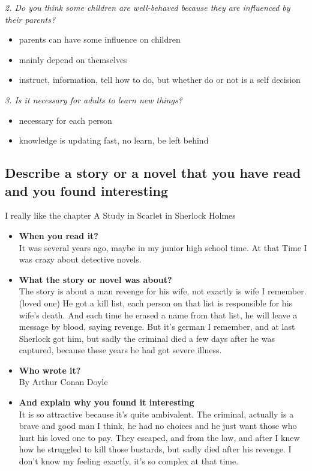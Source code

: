 \documentclass[conference]{IEEEtran}
\begin{document}
\textit{2. Do you think some children are well-behaved because they are influenced by their parents?}
\begin{itemize}
    \item parents can have some influence on children 
    \item mainly depend on themselves
    \item instruct, information, tell how to do, but whether do or not is a self decision
\end{itemize}

\textit{3. Is it necessary for adults to learn new things?}
\begin{itemize}
    \item necessary for each person
    \item knowledge is updating fast, no learn, be left behind
\end{itemize}

\subsection{Describe a story or a novel that you have read and you found interesting}
I really like the chapter A Study in Scarlet in Sherlock Holmes
\begin{itemize}
    \item \textbf{When you read it?}\\
    It was several years ago, maybe in my junior high school time.
    At that Time I was crazy about detective novels.
    \item \textbf{What the story or novel was about?}\\
    The story is about a man revenge for his wife, not exactly is wife I remember.(loved one)
    He got a kill list, each person on that list is responsible for his wife's death.
    And each time he erased a name from that list, he will leave a message by blood, saying revenge.
    But it's german I remember, and at last Sherlock got him, but sadly the criminal died a few days
    after he was captured, because these years he had got severe illness.
    \item \textbf{Who wrote it?}\\
    By Arthur Conan Doyle
    \item \textbf{And explain why you found it interesting}\\
    It is so attractive because it's quite ambivalent.
    The criminal, actually is a brave and good man I think, he had no choices and he just want
    those who hurt his loved one to pay.
    They escaped, and from the law, and after I knew how he struggled to kill those bustards, but sadly died after
    his revenge. I don't know my feeling exactly, it's so complex at that time.
\end{itemize}
\end{document}
